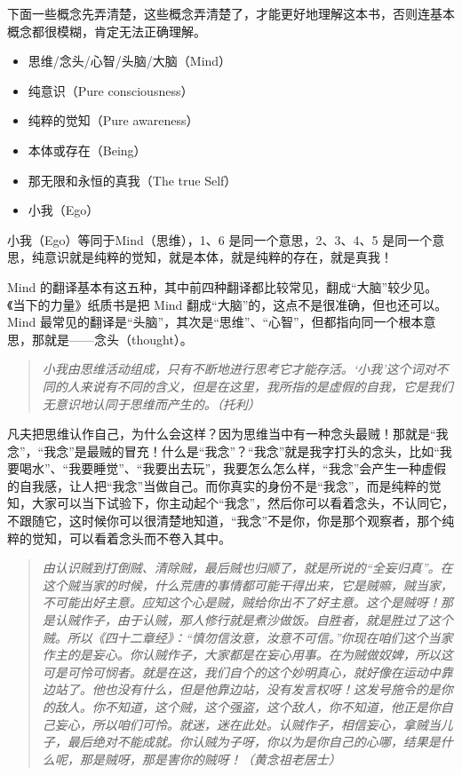 下面一些概念先弄清楚，这些概念弄清楚了，才能更好地理解这本书，否则连基本概念都很模糊，肯定无法正确理解。

\begin{multicols}{2}
    \begin{itemize}
        \item 思维/念头/心智/头脑/大脑（Mind）
        \item 纯意识（Pure consciousness）
        \item 纯粹的觉知（Pure awareness）
        \item 本体或存在（Being）
        \item 那无限和永恒的真我（The true Self）
        \item 小我（Ego）
    \end{itemize}
\end{multicols}

小我（Ego）等同于Mind（思维），1、6 是同一个意思，2、3、4、5 是同一个意思，纯意识就是纯粹的觉知，就是本体，就是纯粹的存在，就是真我！

Mind 的翻译基本有这五种，其中前四种翻译都比较常见，翻成“大脑”较少见。《当下的力量》纸质书是把 Mind 翻成“大脑”的，这点不是很准确，但也还可以。Mind 最常见的翻译是“头脑”，其次是“思维”、“心智”，但都指向同一个根本意思，那就是——念头（thought）。

\begin{quote}\it
    小我由思维活动组成，只有不断地进行思考它才能存活。‘小我’这个词对不同的人来说有不同的含义，但是在这里，我所指的是虚假的自我，它是我们无意识地认同于思维而产生的。（托利）
\end{quote}

凡夫把思维认作自己，为什么会这样？因为思维当中有一种念头最贼！那就是“我念”，“我念”是最贼的冒充！什么是“我念”？“我念”就是我字打头的念头，比如“我要喝水”、“我要睡觉”、“我要出去玩”，我要怎么怎么样，“我念”会产生一种虚假的自我感，让人把“我念”当做自己。而你真实的身份不是“我念”，而是纯粹的觉知，大家可以当下试验下，你主动起个“我念”，然后你可以看着念头，不认同它，不跟随它，这时候你可以很清楚地知道，“我念”不是你，你是那个观察者，那个纯粹的觉知，可以看着念头而不卷入其中。

\begin{quote}\it
    由认识贼到打倒贼、清除贼，最后贼也归顺了，就是所说的“全妄归真”。在这个贼当家的时候，什么荒唐的事情都可能干得出来，它是贼嘛，贼当家，不可能出好主意。应知这个心是贼，贼给你出不了好主意。这个是贼呀！那是认贼作子，由于认贼，那人修行就是煮沙做饭。自胜者，就是胜过了这个贼。所以《四十二章经》：“慎勿信汝意，汝意不可信。”你现在咱们这个当家作主的是妄心。你认贼作子，大家都是在妄心用事。在为贼做奴婢，所以这可是可怜可悯者。就是在这，我们自个的这个妙明真心，就好像在运动中靠边站了。他也没有什么，但是他靠边站，没有发言权呀！这发号施令的是你的敌人。你不知道，这个贼，这个强盗，这个敌人，你不知道，他正是你自己妄心，所以咱们可怜。就迷，迷在此处。认贼作子，相信妄心，拿贼当儿子，最后绝对不能成就。你认贼为子呀，你以为是你自己的心哪，结果是什么呢，那是贼呀，那是害你的贼呀！（黄念祖老居士）
\end{quote}

